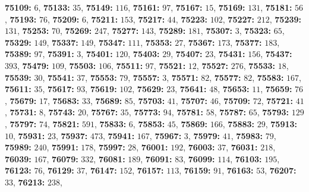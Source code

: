 \textsf{\bfseries 75109:} $6$, \textsf{\bfseries 75133:} $35$, \textsf{\bfseries 75149:} $116$, \textsf{\bfseries 75161:} $97$, \textsf{\bfseries 75167:} $15$, \textsf{\bfseries 75169:} $131$, \textsf{\bfseries 75181:} $56$, \textsf{\bfseries 75193:} $76$, \textsf{\bfseries 75209:} $6$, \textsf{\bfseries 75211:} $153$, \textsf{\bfseries 75217:} $44$, \textsf{\bfseries 75223:} $102$, \textsf{\bfseries 75227:} $212$, \textsf{\bfseries 75239:} $131$, \textsf{\bfseries 75253:} $70$, \textsf{\bfseries 75269:} $247$, \textsf{\bfseries 75277:} $143$, \textsf{\bfseries 75289:} $181$, \textsf{\bfseries 75307:} $3$, \textsf{\bfseries 75323:} $65$, \textsf{\bfseries 75329:} $149$, \textsf{\bfseries 75337:} $149$, \textsf{\bfseries 75347:} $111$, \textsf{\bfseries 75353:} $27$, \textsf{\bfseries 75367:} $173$, \textsf{\bfseries 75377:} $183$, \textsf{\bfseries 75389:} $97$, \textsf{\bfseries 75391:} $3$, \textsf{\bfseries 75401:} $120$, \textsf{\bfseries 75403:} $29$, \textsf{\bfseries 75407:} $23$, \textsf{\bfseries 75431:} $156$, \textsf{\bfseries 75437:} $393$, \textsf{\bfseries 75479:} $109$, \textsf{\bfseries 75503:} $106$, \textsf{\bfseries 75511:} $97$, \textsf{\bfseries 75521:} $12$, \textsf{\bfseries 75527:} $276$, \textsf{\bfseries 75533:} $18$, \textsf{\bfseries 75539:} $30$, \textsf{\bfseries 75541:} $37$, \textsf{\bfseries 75553:} $79$, \textsf{\bfseries 75557:} $3$, \textsf{\bfseries 75571:} $82$, \textsf{\bfseries 75577:} $82$, \textsf{\bfseries 75583:} $167$, \textsf{\bfseries 75611:} $35$, \textsf{\bfseries 75617:} $93$, \textsf{\bfseries 75619:} $102$, \textsf{\bfseries 75629:} $23$, \textsf{\bfseries 75641:} $48$, \textsf{\bfseries 75653:} $11$, \textsf{\bfseries 75659:} $76$, \textsf{\bfseries 75679:} $17$, \textsf{\bfseries 75683:} $33$, \textsf{\bfseries 75689:} $85$, \textsf{\bfseries 75703:} $41$, \textsf{\bfseries 75707:} $46$, \textsf{\bfseries 75709:} $72$, \textsf{\bfseries 75721:} $41$, \textsf{\bfseries 75731:} $8$, \textsf{\bfseries 75743:} $20$, \textsf{\bfseries 75767:} $35$, \textsf{\bfseries 75773:} $94$, \textsf{\bfseries 75781:} $58$, \textsf{\bfseries 75787:} $65$, \textsf{\bfseries 75793:} $129$, \textsf{\bfseries 75797:} $74$, \textsf{\bfseries 75821:} $591$, \textsf{\bfseries 75833:} $6$, \textsf{\bfseries 75853:} $45$, \textsf{\bfseries 75869:} $166$, \textsf{\bfseries 75883:} $29$, \textsf{\bfseries 75913:} $10$, \textsf{\bfseries 75931:} $23$, \textsf{\bfseries 75937:} $473$, \textsf{\bfseries 75941:} $167$, \textsf{\bfseries 75967:} $3$, \textsf{\bfseries 75979:} $41$, \textsf{\bfseries 75983:} $79$, \textsf{\bfseries 75989:} $240$, \textsf{\bfseries 75991:} $178$, \textsf{\bfseries 75997:} $28$, \textsf{\bfseries 76001:} $192$, \textsf{\bfseries 76003:} $37$, \textsf{\bfseries 76031:} $218$, \textsf{\bfseries 76039:} $167$, \textsf{\bfseries 76079:} $332$, \textsf{\bfseries 76081:} $189$, \textsf{\bfseries 76091:} $83$, \textsf{\bfseries 76099:} $114$, \textsf{\bfseries 76103:} $195$, \textsf{\bfseries 76123:} $76$, \textsf{\bfseries 76129:} $37$, \textsf{\bfseries 76147:} $152$, \textsf{\bfseries 76157:} $113$, \textsf{\bfseries 76159:} $91$, \textsf{\bfseries 76163:} $53$, \textsf{\bfseries 76207:} $33$, \textsf{\bfseries 76213:} $238$, 

